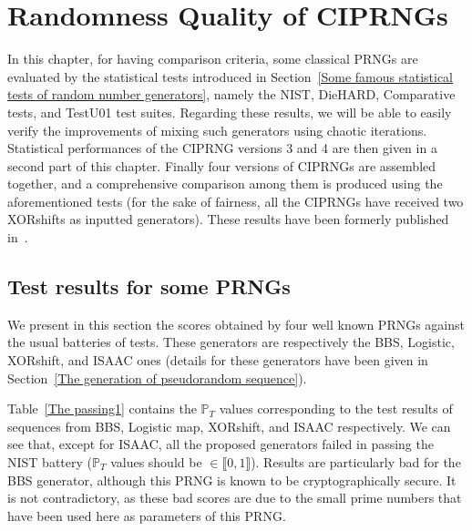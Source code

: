 \chapter{Randomness Quality of CIPRNGs}
\label{Statistical Tests for Randomness}
\minitoc

In this chapter, for having comparison criteria, some classical PRNGs are evaluated by the statistical tests introduced in Section~\ref{Some famous statistical tests of random number generators}, namely the NIST, DieHARD, Comparative tests, and TestU01 test suites.
Regarding these results, we will be able to easily verify the improvements of mixing
such generators using chaotic iterations. Statistical performances of the CIPRNG
versions 3 and 4 are then given in a second part of this chapter. 
Finally four versions of CIPRNGs are assembled together, and a 
comprehensive comparison among them is produced using the aforementioned tests 
(for the sake of fairness, all the CIPRNGs have received two XORshifts as
inputted generators). 
These results have been formerly published in~\cite{bfg12a:ip, bfgw11:ij, bfgw11:ip}.

\section{Test results for some PRNGs}
We present in this section the scores obtained by four well known PRNGs
against the usual batteries of tests. These generators are respectively
the BBS, Logistic, XORshift, and ISAAC ones (details for these
generators have been given in Section~\ref{The generation of pseudorandom sequence}).

\label{for nist}

Table~\ref{The passing1} contains the $\mathbb{P}_T$ values 
corresponding to the test results of sequences from BBS, Logistic map, XORshift, and ISAAC 
respectively. 
We can see that, except for ISAAC, all the proposed generators failed
in passing the NIST battery ($\mathbb{P}_T$ values should be $\in \llbracket 0, 1 \rrbracket$). Results are particularly bad for the BBS
generator, although this PRNG is known to be cryptographically secure.
It is not contradictory, as these bad scores are due to the small prime 
numbers that have been used here as parameters of this PRNG.


